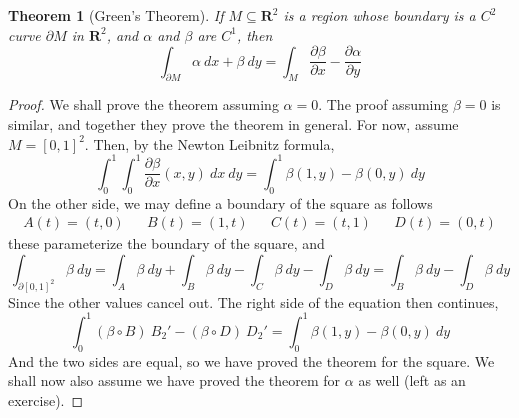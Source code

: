 \documentclass[12pt]{amsbook}
\theoremstyle{plain}
\newtheorem{theorem}{Theorem}
\theoremstyle{definition}
\begin{document}
\begin{theorem}[Green's Theorem]
    If $M \subseteq \mathbf{R}^2$ is a region whose boundary is a $C^2$ curve $\partial M$ in $\mathbf{R}^2$, and $\alpha$ and $\beta$ are $C^1$, then
    \[ \int_{\partial M} \alpha\ dx + \beta\ dy = \int_M \frac{\partial \beta}{\partial x} - \frac{\partial \alpha}{\partial y} \]
\end{theorem}
\begin{proof}
    We shall prove the theorem assuming $\alpha = 0$. The proof assuming $\beta = 0$ is similar, and together they prove the theorem in general. For now, assume $M = [0,1]^2$. Then, by the Newton Leibnitz formula,
    \[ \int_0^1 \int_0^1 \frac{\partial \beta}{\partial x}(x,y)\ dx\ dy = \int_0^1 \beta(1,y) - \beta(0,y)\ dy \]
    On the other side, we may define a boundary of the square as follows
    \begin{align*}
        A(t) = (t,0) && B(t) = (1,t) && C(t) = (t,1) && D(t) = (0,t)
    \end{align*}
    these parameterize the boundary of the square, and
    \[ \int_{\partial [0,1]^2} \beta\ dy = \int_A \beta\ dy + \int_B \beta\ dy - \int_C \beta\ dy - \int_D \beta\ dy = \int_B \beta\ dy - \int_D \beta\ dy \]
    Since the other values cancel out. The right side of the equation then continues,
    \[ \int_0^1 (\beta \circ B)\ B_2' - (\beta \circ D)\ D_2' = \int_0^1 \beta(1,y) - \beta(0,y)\ dy \]
    And the two sides are equal, so we have proved the theorem for the square. We shall now also assume we have proved the theorem for $\alpha$ as well (left as an exercise).


\end{proof}
\end{document}
